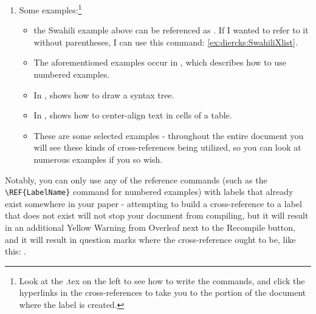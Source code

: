 \documentclass[output=paper,colorlinks,citecolor=brown,
]{langscibook}
\begin{document}
\begin{enumerate}
\begin{itemize}
\item Example reference without parens — note caps (will read `\#’ in output): \\ \verb|\ref{ex:author:yourlabel}|

\end{itemize}

\item Some examples:\footnote{Look at the .tex on the left to see how to write the commands, and click the hyperlinks in the cross-references to take you to the portion of the document where the label is created.}

\begin{itemize}

\item the Swahili example above can be referenced as . If I wanted to refer to it without parentheses, I can use this command: \ref{ex:diercks:SwahiliXlist}.

\item The aforementioned examples occur in , which describes how to use numbered examples.

\item In ,  shows how to draw a syntax tree.

\item  In ,   shows how to center-align text in cells of a table.

\item These are some selected examples - throughout the entire document you will see these kinds of cross-references being utilized, so you can look at numerous examples if you so wish.

\end{itemize}

\end{enumerate}

Notably, you can only use any of the reference commands (such as the \verb|\REF{LabelName}| command for numbered examples) with labels that already exist somewhere in your paper - attempting to build a cross-reference to a label that does not exist will not stop your document from compiling, but it will result in an additional Yellow Warning from Overleaf next to the Recompile button, and it will result in question marks where the cross-reference ought to be, like this: . %
\end{document}
